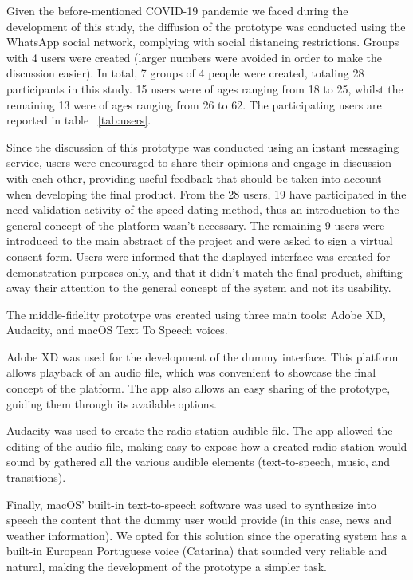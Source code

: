 {{Given the before-mentioned COVID-19 pandemic we faced during the development of this study, the diffusion of the prototype was conducted using the WhatsApp social network, complying with social distancing restrictions. Groups with 4 users were created (larger numbers were avoided in order to make the discussion easier). In total, 7 groups of 4 people were created, totaling 28 participants in this study. 15 users were of ages ranging from 18 to 25, whilst the remaining 13 were of ages ranging from 26 to 62. The participating users are reported in table ~\ref{tab:users}.

Since the discussion of this prototype was conducted using an instant messaging service, users were encouraged to share their opinions and engage in discussion with each other, providing useful feedback that should be taken into account when developing the final product. From the 28 users, 19 have participated in the need validation activity of the speed dating method, thus an introduction to the general concept of the platform wasn't necessary. The remaining 9 users were introduced to the main abstract of the project and were asked to sign a virtual consent form. Users were informed that the displayed interface was created for demonstration purposes only, and that it didn't match the final product, shifting away their attention to the general concept of the system and not its usability.

The middle-fidelity prototype was created using three main tools: Adobe XD, Audacity, and macOS Text To Speech voices. 

Adobe XD was used for the development of the dummy interface. This platform allows playback of an audio file, which was convenient to showcase the final concept of the platform. The app also allows an easy sharing of the prototype, guiding them through its available options. 

Audacity was used to create the radio station audible file. The app allowed the editing of the audio file, making easy to expose how a created radio station would sound by gathered all the various audible elements (text-to-speech, music, and transitions). 

Finally, macOS' built-in text-to-speech software was used to synthesize into speech the content that the dummy user would provide (in this case, news and weather information). We opted for this solution since the operating system has a built-in European Portuguese voice (Catarina) that sounded very reliable and natural, making the development of the prototype a simpler task.

}}
